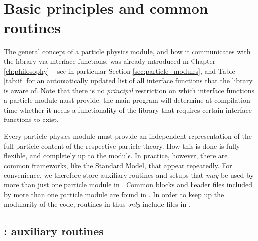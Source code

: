 \chapter{Basic principles and common routines}

The general concept of  a particle physics module, and how it communicates with the 
library via interface functions, was already introduced in Chapter \ref{ch:philosophy} -- see in particular
Section \ref{sec:particle_modules}, and Table \ref{tab:if} for an automatically updated list of all interface 
functions that the  library is aware of. Note that there is no {\it principal} restriction on 
which interface functions a particle module must provide: the main program will determine
at compilation time whether it needs a functionality of the  library that requires 
certain interface functions to exist.

Every particle physics module must provide an independent representation of the
full particle content of the respective particle theory. How this is done is fully flexible, and 
completely up to the module. In practice, however, there are common frameworks,
like the Standard Model, that appear repeatedly. For convenience, we therefore store auxiliary 
routines and setups that {\it may} be used by more than just one particle module in 
. Common blocks and header files included by more than one
particle module are found in . In order to keep up the modularity
of the code, routines in  thus {\it only} include files in 
.



\section{: auxiliary routines}

